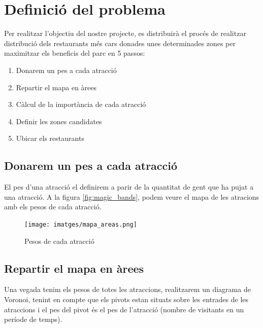 \documentclass[12pt]{article}
\begin{document}
\clearpage
\section{Definició del problema}
Per realitzar l'objectiu del nostre projecte, es distribuirà el procés de realitzar distribució dels restaurants més cars donades unes determinades zones per maximitzar els beneficis del parc en 5 passos:
\begin{enumerate}
	\item Donarem un pes a cada atracció
	\item Repartir el mapa en àrees
	\item Càlcul de la importància de cada atracció
	\item Definir les zones candidates
	\item Ubicar els restaurants
\end{enumerate}

\subsection{Donarem un pes a cada atracció}
El pes d'una atracció el definirem a parir de la quantitat de gent que ha pujat a una atracció. A la figura \ref{fig:magic_bands}, podem veure el mapa de les atracions amb els pesos de cada atracció.

\begin{figure}[h!]
	\centering
	\texttt{[image: imatges/mapa\_areas.png]}\par\vspace{1cm}
	\caption{Pesos de cada atracció}
	\label{fig:mapa_areas}
\end{figure}

\subsection{Repartir el mapa en àrees}
Una vegada tenim els pesos de totes les atraccions, realitzarem un diagrama de Voronoi, tenint en compte que els pivots estan situats sobre les entrades de les atraccions i el pes del pivot és el pes de l'atracció (nombre de visitants en un període de temps).
		
\end{document}

